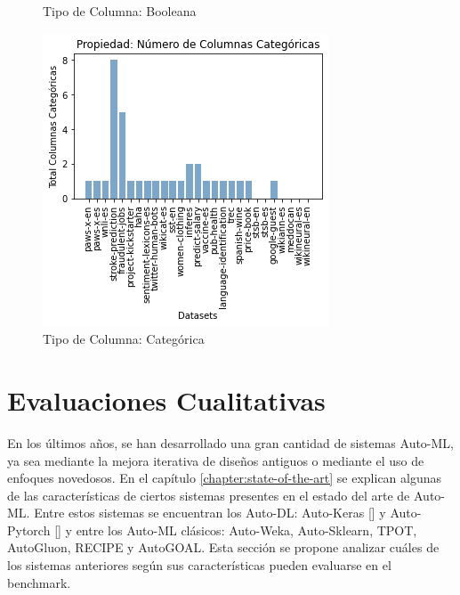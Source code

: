 \begin{figure}
\begin{minipage}[b]{0.31\textwidth}
        \caption{Tipo de Columna: Booleana}
        \label{fig:columns-b}
  \end{minipage}      
\hspace{0.01cm}
    \begin{minipage}[b]{0.31\textwidth}
        \centering
        \includegraphics[width=\textwidth]{Graphics/results/columns_c.png}
          \caption{Tipo de Columna: Categórica}
          \label{fig:columns-c}
        \end{minipage} 
\end{figure}

\section{Evaluaciones Cualitativas}\label{section:qualitative}

En los últimos años, se han desarrollado una gran cantidad de sistemas Auto-ML, ya sea mediante la mejora iterativa de diseños antiguos o mediante 
el uso de enfoques novedosos. En el capítulo \ref{chapter:state-of-the-art} se explican algunas de las características de ciertos sistemas presentes en el 
estado del arte de Auto-ML. Entre estos sistemas se encuentran los Auto-DL: Auto-Keras [\cite{13}] y Auto-Pytorch [\cite{21}] y entre los Auto-ML clásicos: Auto-Weka, 
Auto-Sklearn, TPOT, AutoGluon, RECIPE y AutoGOAL.  
Esta sección se propone analizar cuáles de los sistemas anteriores según sus características pueden evaluarse en el benchmark.

